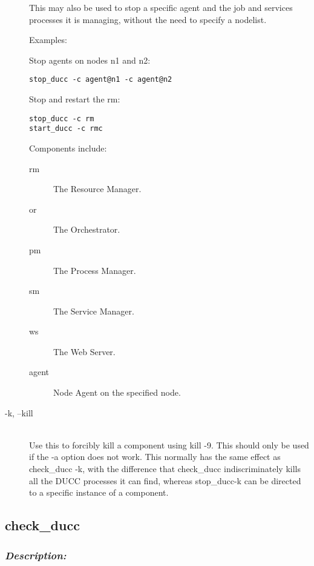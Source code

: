 \begin{description}
            This may also be used to stop a specific agent and the job and services processes it is
            managing, without the need to specify a nodelist.  
            
            Examples: 

            Stop agents on nodes n1 and n2:
\begin{verbatim}
stop_ducc -c agent@n1 -c agent@n2 
\end{verbatim}
            
            Stop and restart the rm: 
\begin{verbatim}
stop_ducc -c rm 
start_ducc -c rmc 
\end{verbatim}
            
            Components include: 
            \begin{description}
              \item[rm] The Resource Manager.                 
              \item[or] The Orchestrator.                 
              \item[pm] The Process Manager.                 
              \item[sm] The Service Manager.                 
              \item[ws] The Web Server.                 
              \item[agent\@node] Node Agent on the specified node.
              \end{description}
              
            \item[-k, --kill] \hfill \\
              Use this to forcibly kill a component using kill -9. This should only be used if the -a option 
              does not work. This normally has the same effect as check\_ducc -k, with the difference that 
              check\_ducc indiscriminately kills all the DUCC processes it can find, whereas stop\_ducc-k 
              can be directed to a specific instance of a component. 

       \end{description}
            

          


\subsection{check\_ducc}
\label{subsec:admin.check-ducc}
    \subsubsection{{\em Description:}}

